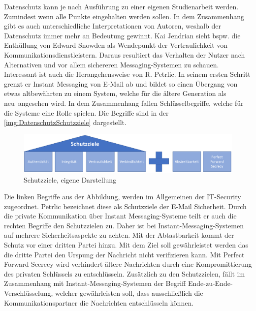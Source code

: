 \documentclass[a4paper,titlepage,halfparskip,12pt]{scrreprt}
\begin{document}
\begin{onehalfspacing}
Datenschutz kann je nach Ausführung zu einer eigenen Studienarbeit werden. Zumindest wenn alle Punkte eingehalten werden sollen. In dem Zusammenhang gibt es auch unterschiedliche Interpretationen von Autoren, weshalb der Datenschutz immer mehr an Bedeutung gewinnt. Kai Jendrian sieht bspw. die Enthüllung von Edward Snowden als Wendepunkt der Vertraulichkeit von Kommunikationsdienstleistern. Daraus resultiert das Verhalten der Nutzer nach Alternativen und vor allem sichereren Messaging-Systemen zu schauen. \cite{jendrian14SicheresIM}\\
Interessant ist auch die Herangehensweise von R. Petrlic. In seinem ersten Schritt grenzt er Instant Messaging von E-Mail ab und bildet so einen Übergang von etwas altbewährten zu einem System, welche für die ältere Generation als \glqq neu\grqq\ angesehen wird. In dem  Zusammenhang fallen Schlüsselbegriffe, welche für die Systeme eine Rolle spielen. Die Begriffe sind in der \autoref{img:DatenschutzSchutzziele} dargestellt.
\begin{figure}[h]
	\centering
	\includegraphics[scale=0.5]{images/DatenschutzSchutzziele}
	\caption{Schutzziele, eigene Darstellung}
	\label{img:DatenschutzSchutzziele}
\end{figure}
Die linken Begriffe aus der Abbildung, werden im Allgemeinen der IT-Security zugeordnet. Petrlic bezeichnet diese als Schutzziele der E-Mail Sicherheit. Durch die private Kommunikation über Instant Messaging-Systeme teilt er auch die rechten Begriffe den Schutzzielen zu. Daher ist bei Instant-Messaging-Systemen auf mehrere Sicherheitsaspekte zu achten. Mit der Abtastbarkeit kommt der Schutz vor einer dritten Partei hinzu. Mit dem Ziel soll gewährleistet werden das die dritte Partei den Urspung der Nachricht nicht verifizieren kann. Mit Perfect Forward Secrecy wird verhindert ältere Nachrichten durch eine Kompromittierung des privaten Schlüssels zu entschlüsseln. Zusätzlich zu den Schutzzielen, fällt im Zusammenhang mit Instant-Messaging-Systemen der Begriff Ende-zu-Ende-Verschlüsselung, welcher gewährleisten soll, dass ausschließlich die Kommunikationspartner die Nachrichten entschlüsseln können. \cite{petrlic2017datenschutz}


\end{onehalfspacing}
\end{document}
